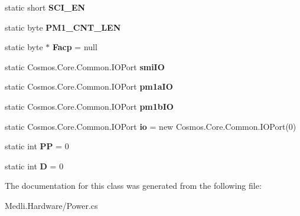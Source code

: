 \begin{DoxyCompactItemize}
static short {\bfseries S\+C\+I\+\_\+\+EN}
\item 
\mbox{\label{class_medli_1_1_hardware_1_1_a_c_p_i_a09237fd1fd6c181d1a7065d91c77a80a}} 
static byte {\bfseries P\+M1\+\_\+\+C\+N\+T\+\_\+\+L\+EN}
\item 
\mbox{\label{class_medli_1_1_hardware_1_1_a_c_p_i_a8e172474e0d7f07f670260ec5315cbac}} 
static byte $\ast$ {\bfseries Facp} = null
\item 
\mbox{\label{class_medli_1_1_hardware_1_1_a_c_p_i_a9eb1eb29bb25b5a357f96a7a192fe667}} 
static Cosmos.\+Core.\+Common.\+I\+O\+Port {\bfseries smi\+IO}
\item 
\mbox{\label{class_medli_1_1_hardware_1_1_a_c_p_i_a10b4220f4298cc64aa54d98da0aa883d}} 
static Cosmos.\+Core.\+Common.\+I\+O\+Port {\bfseries pm1a\+IO}
\item 
\mbox{\label{class_medli_1_1_hardware_1_1_a_c_p_i_ac7108ef14eea1995561acbe03d39e1a3}} 
static Cosmos.\+Core.\+Common.\+I\+O\+Port {\bfseries pm1b\+IO}
\item 
\mbox{\label{class_medli_1_1_hardware_1_1_a_c_p_i_aaaddd7d02824285da01997f0f6f94e88}} 
static Cosmos.\+Core.\+Common.\+I\+O\+Port {\bfseries io} = new Cosmos.\+Core.\+Common.\+I\+O\+Port(0)
\item 
\mbox{\label{class_medli_1_1_hardware_1_1_a_c_p_i_afd0a959065d129b395452f1613c74937}} 
static int {\bfseries PP} = 0
\item 
\mbox{\label{class_medli_1_1_hardware_1_1_a_c_p_i_a1326e97a1cbce4d754a1ead5889bb09c}} 
static int {\bfseries D} = 0
\end{DoxyCompactItemize}


The documentation for this class was generated from the following file\+:\begin{DoxyCompactItemize}
\item 
Medli.\+Hardware/Power.\+cs\end{DoxyCompactItemize}
